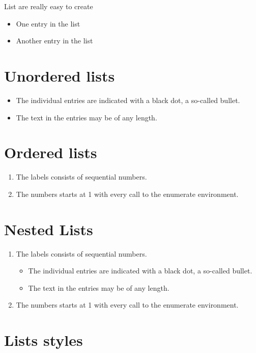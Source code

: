 \documentclass{article}
\begin{document}
List are really easy to create
 
\begin{itemize}
    \item One entry in the list
    \item Another entry in the list
\end{itemize}

\section{Unordered lists}

\begin{itemize}
    \item The individual entries are indicated with a black dot, a so-called bullet.
    \item The text in the entries may be of any length.
\end{itemize}

\section{Ordered lists}

\begin{enumerate}
    \item The labels consists of sequential numbers.
    \item The numbers starts at 1 with every call to the enumerate environment.
\end{enumerate}

\section{Nested Lists}

\begin{enumerate}
    \item The labels consists of sequential numbers.
        \begin{itemize}
            \item The individual entries are indicated with a black dot, a so-called bullet.
            \item The text in the entries may be of any length.
        \end{itemize}
    \item The numbers starts at 1 with every call to the enumerate environment.
\end{enumerate}

\section{Lists styles}
\end{document}
